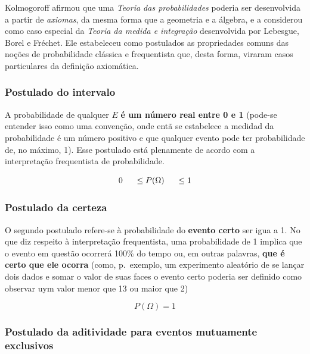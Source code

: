 \documentclass[
]{book}
\begin{document}
\hfill\break

Kolmogoroff afirmou que uma \emph{Teoria das probabilidades} poderia ser desenvolvida a partir de \emph{axiomas}, da
mesma forma que a geometria e a álgebra, e a considerou como caso especial da \emph{Teoria da medida e integração} desenvolvida por Lebesgue, Borel e Fréchet. Ele estabeleceu como postulados as propriedades comuns das noções de probabilidade clássica e frequentista que, desta forma, viraram casos particulares da definição axiomática.

\hfill\break

\hypertarget{postulado-do-intervalo}{%
\subsubsection{Postulado do intervalo}\label{postulado-do-intervalo}}

A probabilidade de qualquer \(E\) \textbf{é um número real entre 0 e 1} (pode-se entender isso como uma convenção, onde entã se estabelece a medidad da probabilidade é um número positivo e que qualquer evento pode ter probabilidade de, no máximo, 1). Esse postulado está plenamente de acordo com a interpretação frequentista de probabilidade.

\hfill\break

\[
0 \hspace{0.5cm} \le P(\Omega) \hspace{0.5cm} \le 1
\]

\hfill\break

\hypertarget{postulado-da-certeza}{%
\subsubsection{Postulado da certeza}\label{postulado-da-certeza}}

O segundo postulado refere-se à probabilidade do \textbf{evento certo} ser igua a 1. No que diz respeito à interpretação frequentista, uma probabilidade de 1 implica que o evento em questão ocorrerá 100\% do tempo ou, em outras palavras, \textbf{que é certo que ele ocorra} (como, p.~exemplo, um experimento aleatório de se lançar dois dados e somar o valor de suas faces o evento certo poderia ser definido como observar uym valor menor que 13 ou maior que 2)

\hfill\break

\[
P(\Omega) = 1
\]

\hfill\break

\hypertarget{postulado-da-aditividade-para-eventos-mutuamente-exclusivos}{%
\subsubsection{Postulado da aditividade para eventos mutuamente exclusivos}\label{postulado-da-aditividade-para-eventos-mutuamente-exclusivos}}
\end{document}
